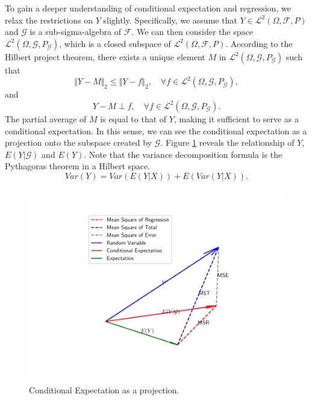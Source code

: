 To gain a deeper understanding of conditional expectation and regression, we relax the restrictions on $Y$ slightly. Specifically, we assume that $Y \in \mathcal{L}^2(\Omega, \mathcal{F}, P)$ and $\mathcal{G}$ is a sub-sigma-algebra of $\mathcal{F}$. We can then consider the space $\mathcal{L}^2(\Omega, \mathcal{G}, P_{\mathcal{G}})$, which is a closed subspace of $\mathcal{L}^2(\Omega, \mathcal{F}, P)$. According to the Hilbert project theorem, there exists a unique element $M$ in $\mathcal{L}^2(\Omega, \mathcal{G}, P_{\mathcal{G}})$ such that
\begin{equation}
\Vert Y - M \Vert_2 \leq \Vert Y- f\Vert_2, \quad \forall f \in \mathcal{L}^2(\Omega, \mathcal{G}, P_{\mathcal{G}}),	
\end{equation}
and
$$
Y - M \perp f, \quad \forall f \in \mathcal{L}^2(\Omega, \mathcal{G}, P_{\mathcal{G}}).
$$
The partial average of $M$ is equal to that of $Y$, making it sufficient to serve as a conditional expectation. In this sense, we can see the conditional expectation as a projection onto the subspace created by $\mathcal{G}$. Figure \ref{fig:conditonalexpectation} reveals the relationship of $Y$, $E(Y|\mathcal{G})$ and $E(Y)$. Note that the variance decomposition formula is the Pythagoras theorem in a Hilbert space.
\begin{equation}
	Var(Y) = Var(E(Y|X))+ E(Var(Y|X)).
\end{equation}
\begin{figure}[htb]
	\centering
	\includegraphics{figure/conditional.pdf}
	\vspace{-1.7cm}
	\caption{Conditional Expectation as a projection.}
	\label{fig:conditonalexpectation}
\end{figure}


